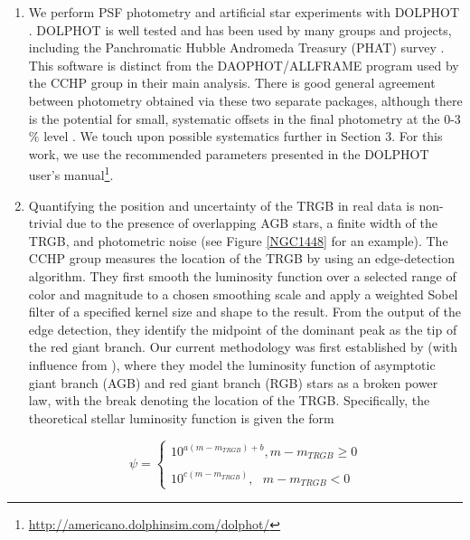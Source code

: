 \documentclass[twocolumn]{aastex62}
\begin{document}
\begin{enumerate}

    \item We perform PSF photometry and artificial star experiments with DOLPHOT \citep{2000PASP..112.1383D, 2016ascl.soft08013D}. DOLPHOT is well tested and has been used by many groups and projects, including the Panchromatic Hubble Andromeda Treasury (PHAT) survey \citep{2012ApJS..200...18D, 2014ApJS..215....9W}. This software is distinct from the DAOPHOT/ALLFRAME program \citep{1987PASP...99..191S} used by the CCHP group in their main analysis. There is good general agreement between photometry obtained via these two separate packages, although there is the potential for small, systematic offsets in the final photometry at the 0-3$\%$ level \citep{2009ApJS..183...67D, 2010ApJ...720.1225M, 2014ApJS..215....9W, 2021ApJ...906..125J}. We touch upon possible systematics further in Section 3. For this work, we use the recommended parameters presented in the DOLPHOT user's manual\footnote{\url{http://americano.dolphinsim.com/dolphot/}}.
    
    \item Quantifying the position and uncertainty of the TRGB in real data is non-trivial due to the presence of overlapping AGB stars, a finite width of the TRGB, and photometric noise (see Figure \ref{NGC1448} for an example).  The CCHP group measures the location of the TRGB by using an edge-detection algorithm. They first smooth the luminosity function over a selected range of color and magnitude to a chosen smoothing scale and apply a weighted Sobel filter of a specified kernel size and shape to the result. From the output of the edge detection, they identify the midpoint of the dominant peak as the tip of the red giant branch. Our current methodology was first established by \cite{2006AJ....132.2729M} (with influence from \citealt{2002AJ....124..213M}), where they model the luminosity function of asymptotic giant branch (AGB) and red giant branch (RGB) stars as a broken power law, with the break denoting the location of the TRGB. Specifically, the theoretical stellar luminosity function is given the form
    
    \begin{equation}
    \psi = \left\{\begin{matrix}10^{a(m-m_{TRGB})+b}, m-m_{TRGB} \geq 0 \\ 
    \\
    10^{c(m-m_{TRGB})}, \ \ \ m-m_{TRGB} < 0 \end{matrix}\right. 
    \end{equation}


\end{enumerate}
\end{document}
